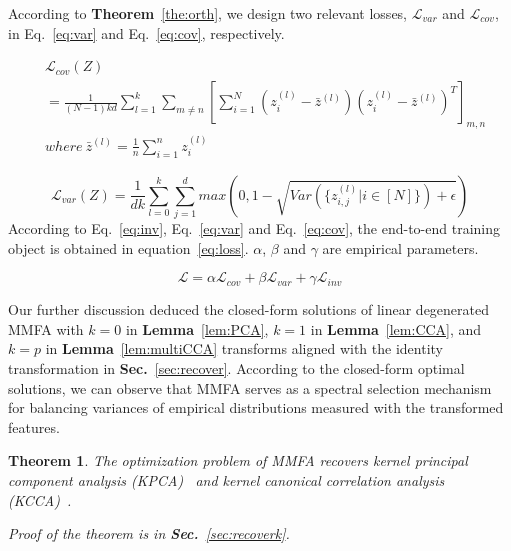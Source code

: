 \documentclass{article}
\newtheorem{theorem}{\textbf{Theorem}} %
\begin{document}
According to \textbf{Theorem}~\ref{the:orth}, we design two relevant losses, $\mathcal{L}_{var}$ and $\mathcal{L}_{cov}$, in Eq.~\ref{eq:var} and Eq.~\ref{eq:cov}, respectively.

\begin{equation}\label{eq:var}
\begin{aligned}
    & \mathcal{L}_{cov}(Z) \\
    & = \frac 1 {(N - 1)kd} \sum_{l=1}^k \sum_{m \neq n} [\sum_{i=1}^N(z_{i}^{(l)} - \bar z^{(l)})(z_{i}^{(l)} - \bar z^{(l)})^T]_{m,n} \\ 
    & where \ \bar z^{(l)} = \frac 1 n \sum_{i=1}^n z_{i}^{(l)}
\end{aligned}
\end{equation}

\begin{equation}\label{eq:cov}
    \mathcal{L}_{var}(Z) = \frac 1 {dk} \sum_{l=0}^k \sum_{j=1}^d max(0, 1 - \sqrt{Var(\{z^{(l)}_{i,j} | i\in [N]\}) + \epsilon})
\end{equation}
According to Eq.~\ref{eq:inv}, Eq.~\ref{eq:var} and Eq.~\ref{eq:cov}, the end-to-end training object is obtained in equation~\ref{eq:loss}. $\alpha$, $\beta$ and $\gamma$ are empirical parameters.

\begin{equation}\label{eq:loss}
    \mathcal{L} = \alpha \mathcal{L}_{cov} + \beta \mathcal{L}_{var} + \gamma \mathcal{L}_{inv}
\end{equation}


Our further discussion deduced the closed-form solutions of linear degenerated MMFA with $k=0$ in \textbf{Lemma}~\ref{lem:PCA}, $k=1$ in \textbf{Lemma}~\ref{lem:CCA}, and $k=p$ in \textbf{Lemma}~\ref{lem:multiCCA} transforms aligned with the identity transformation in \textbf{Sec.}~\ref{sec:recover}.  According to the closed-form optimal solutions, we can observe that MMFA serves as a spectral selection mechanism for balancing variances of empirical distributions measured with the transformed features.

\begin{theorem}\label{theorem:recover}
    The optimization problem of MMFA recovers kernel principal component analysis (KPCA)~\cite{kpca} and kernel canonical correlation analysis (KCCA)~\cite{fukumizu2007statistical}.

    Proof of the theorem is in \textbf{Sec.}~\ref{sec:recoverk}.
\end{theorem}
\end{document}
